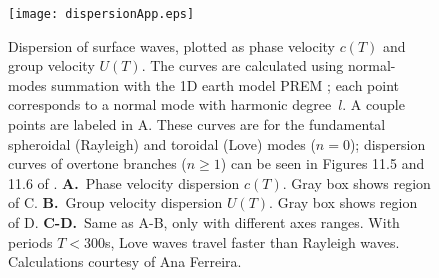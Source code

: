 \begin{figure}
\centering
\texttt{[image: dispersionApp.eps]}
\caption[Dispersion of surface waves]
{{
Dispersion of surface waves, plotted as phase velocity $c(T)$ and group velocity $U(T)$. The curves are calculated using normal-modes summation with the 1D earth model PREM \citep{PREM}; each point corresponds to a normal mode with harmonic degree~$l$. A couple points are labeled in A. These curves are for the fundamental spheroidal (Rayleigh) and toroidal (Love) modes ($n = 0$); dispersion curves of overtone branches ($n \ge 1$)  can be seen in Figures 11.5 and 11.6 of \citet{DT}.
{\bf A.}~Phase velocity dispersion $c(T)$. Gray box shows region of C.
{\bf B.}~Group velocity dispersion $U(T)$. Gray box shows region of D.
{\bf C-D.}~Same as A-B, only with different axes ranges.
With periods $T<300$s, Love waves travel faster than Rayleigh waves.
Calculations courtesy of Ana Ferreira.
}}
\label{fig:dispersionApp}
\end{figure}
